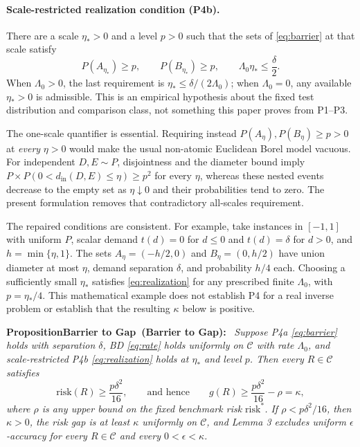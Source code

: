 \documentclass[twoside,11pt]{article}
\newenvironment{uprop}[1][]{\par\medskip\noindent\textbf{Proposition\ifx\relax#1\relax\else\ (#1)\fi:}\ \itshape}{\par\medskip}
\begin{document}
\paragraph{Scale-restricted realization condition (P4b).} There are a scale $\eta_*>0$ and a level $p>0$ such that the sets of \eqref{eq:barrier} at that scale satisfy
\begin{equation}
P(A_{\eta_*})\geq p, \qquad P(B_{\eta_*})\geq p, \qquad \Lambda_0\eta_*\leq\frac{\delta}{2}.
\label{eq:realization}
\end{equation}
When $\Lambda_0>0$, the last requirement is $\eta_*\leq\delta/(2\Lambda_0)$; when $\Lambda_0=0$, any available $\eta_*>0$ is admissible. This is an empirical hypothesis about the fixed test distribution and comparison class, not something this paper proves from P1--P3.

The one-scale quantifier is essential. Requiring instead $P(A_\eta),P(B_\eta)\geq p>0$ at \emph{every} $\eta>0$ would make the usual non-atomic Euclidean Borel model vacuous. For independent $D,E\sim P$, disjointness and the diameter bound imply $P\times P(0<d_{\mathrm{in}}(D,E)\leq\eta)\geq p^2$ for every $\eta$, whereas these nested events decrease to the empty set as $\eta\downarrow0$ and their probabilities tend to zero. The present formulation removes that contradictory all-scales requirement.

The repaired conditions are consistent. For example, take instances in $[-1,1]$ with uniform $P$, scalar demand $t(d)=0$ for $d\leq0$ and $t(d)=\delta$ for $d>0$, and $h=\min\{\eta,1\}$. The sets $A_\eta=(-h/2,0)$ and $B_\eta=(0,h/2)$ have union diameter at most $\eta$, demand separation $\delta$, and probability $h/4$ each. Choosing a sufficiently small $\eta_*$ satisfies \eqref{eq:realization} for any prescribed finite $\Lambda_0$, with $p=\eta_*/4$. This mathematical example does not establish P4 for a real inverse problem or establish that the resulting $\kappa$ below is positive.

\begin{uprop}[Barrier to Gap]
Suppose P4a \eqref{eq:barrier} holds with separation $\delta$, BD \eqref{eq:rate} holds uniformly on $\mathcal{C}$ with rate $\Lambda_0$, and scale-restricted P4b \eqref{eq:realization} holds at $\eta_*$ and level $p$. Then every $R\in\mathcal{C}$ satisfies
\begin{equation}
\mathrm{risk}(R)\geq\frac{p\delta^2}{16}, \qquad\text{and hence}\qquad g(R)\geq\frac{p\delta^2}{16}-\rho=\kappa,
\label{eq:floor}
\end{equation}
where $\rho$ is any upper bound on the fixed benchmark risk $\mathrm{risk}^*$. If $\rho<p\delta^2/16$, then $\kappa>0$, the risk gap is at least $\kappa$ uniformly on $\mathcal{C}$, and Lemma 3 excludes uniform $\epsilon$-accuracy for every $R\in\mathcal{C}$ and every $0<\epsilon<\kappa$.
\end{uprop}
\end{document}
